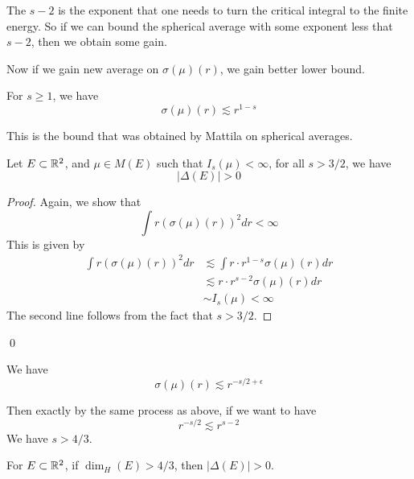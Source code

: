 \begin{remark}
    The $s-2$ is the exponent that one needs to turn the critical integral to the finite energy. So if we can bound the spherical average with some exponent less that $s-2$, then we obtain some gain.
\end{remark}

Now if we gain new average on $\sigma(\mu)(r)$, we gain better lower bound.
\begin{theorem}[Mattila]
    For $s\geq 1$, we have 
    \begin{equation*}
        \sigma(\mu)(r)\lesssim r^{1-s}
    \end{equation*}
\end{theorem}
This is the bound that was obtained by Mattila on spherical averages.
\begin{corollary}
    Let $E\subset\mathbb{R}^2$, and $\mu\in M(E)$ such that $I_s(\mu)<\infty$, for all $s>3/2$, we have 
    \begin{equation*}
        |\Delta(E)|>0
    \end{equation*}
\end{corollary}
\begin{proof}
    Again, we show that 
    \begin{equation*}
        \int r(\sigma(\mu)(r))^2dr<\infty
    \end{equation*}
    This is given by 
    \begin{align*}
        \int r(\sigma(\mu)(r))^2dr&\lesssim \int r\cdot r^{1-s}\sigma(\mu)(r)dr\\
        &\lesssim r\cdot r^{s-2}\sigma(\mu)(r)dr\\
        &\sim I_s(\mu)<\infty
    \end{align*}
    The second line follows from the fact that $s>3/2$.
\end{proof}
\qed

\begin{theorem}[Wolff]
    We have 
    \begin{equation*}
        \sigma(\mu)(r)\lesssim r^{-s/2+\epsilon}
    \end{equation*}
\end{theorem}
Then exactly by the same process as above, if we want to have 
\begin{equation*}
    r^{-s/2}\lesssim r^{s-2}
\end{equation*}
We have $s>4/3$. 
\begin{corollary}
    For $E\subset\mathbb{R}^2$, if $\dim_H(E)>4/3$, then $|\Delta(E)|>0$.
\end{corollary}

